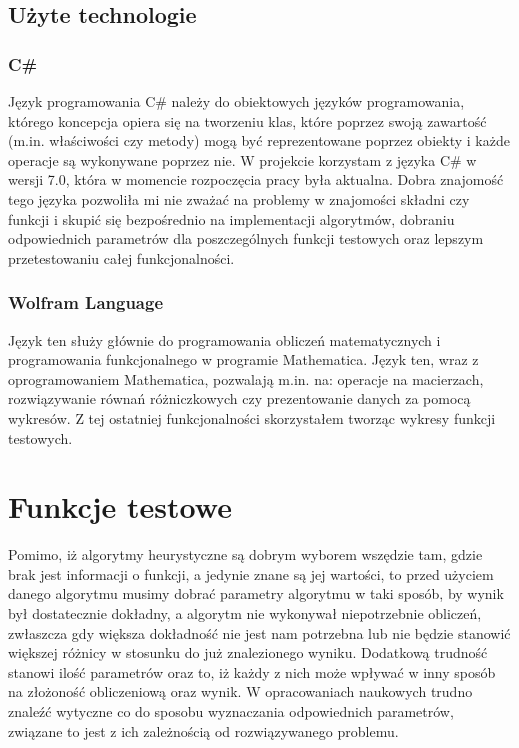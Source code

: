 \documentclass[twoside]{projektInzynierskiMS1}
\newcommand{\si}{ś}
\begin{document}
	\subsection{Użyte technologie}
	\subsubsection{C\#}
Język programowania C\# należy do obiektowych języków programowania, którego koncepcja opiera się na tworzeniu klas, które poprzez swoją zawarto\si ć (m.in. wła\si ciwo\si ci czy metody) mogą być reprezentowane poprzez obiekty i każde operacje są wykonywane poprzez nie. W projekcie korzystam z języka C\# w wersji 7.0, która w momencie rozpoczęcia pracy była aktualna. Dobra znajomo\si ć tego języka pozwoliła mi nie zważać na problemy w znajomo\si ci składni czy funkcji i skupić się bezpo\si rednio na implementacji algorytmów, dobraniu odpowiednich parametrów dla poszczególnych funkcji testowych oraz lepszym przetestowaniu całej funkcjonalno\si ci.

\subsubsection{Wolfram Language}
Język ten służy głównie do programowania obliczeń matematycznych i programowania funkcjonalnego w programie Mathematica. Język ten, wraz z oprogramowaniem Mathematica, pozwalają m.in. na: operacje na macierzach, rozwiązywanie równań różniczkowych czy prezentowanie danych za pomocą wykresów. Z tej ostatniej funkcjonalno\si ci skorzystałem tworząc wykresy funkcji testowych.

\section{Funkcje testowe}
Pomimo, iż algorytmy heurystyczne są dobrym wyborem wszędzie tam, gdzie brak jest informacji o funkcji, a jedynie znane są jej warto\si ci, to przed użyciem danego algorytmu musimy dobrać parametry algorytmu w taki sposób, by wynik był dostatecznie dokładny, a algorytm nie wykonywał niepotrzebnie obliczeń, zwłaszcza gdy większa dokładno\si ć nie jest nam potrzebna lub nie będzie stanowić większej różnicy w stosunku do już znalezionego wyniku. Dodatkową trudno\si ć stanowi ilo\si ć parametrów oraz to, iż każdy z nich może wpływać w inny sposób na złożono\si ć obliczeniową oraz wynik. W opracowaniach naukowych trudno znaleźć wytyczne co do sposobu wyznaczania odpowiednich parametrów, związane to jest z ich zależno\si cią od rozwiązywanego problemu. \\
\end{document}
